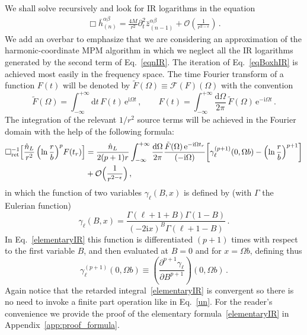 \documentclass[prd,preprint,superscriptaddress,tightenlines,nofootinbib,
  eqsecnum,showpacs]{revtex4}
\newcommand{\ud}{\mathrm{d}}
\newcommand{\ui}{\mathrm{i}}
\begin{document}
We shall solve recursively and look for IR logarithms in the equation
%
\begin{align} \label{eqBoxhIR}
\Box \bar{h}^{\alpha\beta}_{(n)} = \frac{4 M}{r^2} \partial_t^2
\bar{z}^{\alpha\beta}_{(n-1)} + \mathcal{O}\left(\frac{1}{r^{3 -
    \epsilon}}\right)\,.
\end{align}
%
We add an overbar to emphasize that we are considering an
approximation of the harmonic-coordinate MPM algorithm in which we
neglect all the IR logarithms generated by the second term of
Eq.~\eqref{eqnIR}. The iteration of Eq.~\eqref{eqBoxhIR} is achieved
most easily in the frequency space. The time Fourier transform of a
function $F(t)$ will be denoted by $\tilde{F}(\Omega) \equiv
\mathcal{F}(F)(\Omega)$ with the convention
%
\begin{equation}\label{Fourier}
\tilde{F}(\Omega) = \int_{-\infty}^{+\infty} \!\! \ud t \,
F(t)\,\mathrm{e}^{\ui \Omega t} \,,\qquad F(t) =
\int_{-\infty}^{+\infty} \!  \frac{\ud \Omega}{2\pi}
\,\tilde{F}(\Omega)\,\mathrm{e}^{-\ui \Omega t} \,.
\end{equation}
%
The integration of the relevant $1/r^2$ source terms will be achieved
in the Fourier domain with the help of the following formula:
%
\begin{align} \label{elementaryIR}
 \Box^{-1}_\mathrm{ret} \Bigl[ \frac{\hat{n}_L}{r^2}
   \left(\ln\frac{r}{b}\right)^p \!F(t_r)\Bigr] &=
 \frac{\hat{n}_L}{2(p+1)r}
 \int_{-\infty}^{+\infty}\frac{\ud\Omega}{2\pi}
 \frac{\tilde{F}(\Omega)\,\mathrm{e}^{-\ui \Omega
     t_r}}{(-\ui\Omega)}\biggl[ \gamma_\ell^{(p+1)}(0,\Omega b) -
   \left(\ln\frac{r}{b}\right)^{p+1} \biggr]\nonumber\\ &+
 \mathcal{O}\Big( \frac{1}{r^{2-\epsilon}}\Big) \,,
\end{align}
%
in which the function of two variables $\gamma_\ell(B,x)$ is defined
by (with $\Gamma$ the Eulerian function) 
%
\begin{equation}\label{gammaell}
\gamma_\ell(B,x) = \frac{\Gamma(\ell+1+B)\Gamma(1-B)}{(-2\ui
  x)^{B}\Gamma(\ell+1-B)}\,.
\end{equation}
%
In Eq.~\eqref{elementaryIR} this function is differentiated $(p+1)$
times with respect to the first variable $B$, and then evaluated at
$B=0$ and for $x=\Omega b$, defining thus
%
\begin{equation}\label{gammaellexpl}
\gamma_\ell^{(p+1)}(0,\Omega b) \equiv
\left(\frac{\partial^{p+1}\gamma_\ell}{\partial B^{p+1}}\right)(0,
\Omega b)\,.
\end{equation}
%
Again notice that the retarded integral~\eqref{elementaryIR} is
convergent so there is no need to invoke a finite part operation like
in Eq.~\eqref{un}. For the reader's convenience we provide the proof
of the elementary formula~\eqref{elementaryIR} in
Appendix~\ref{app:proof_formula}.
\end{document}
